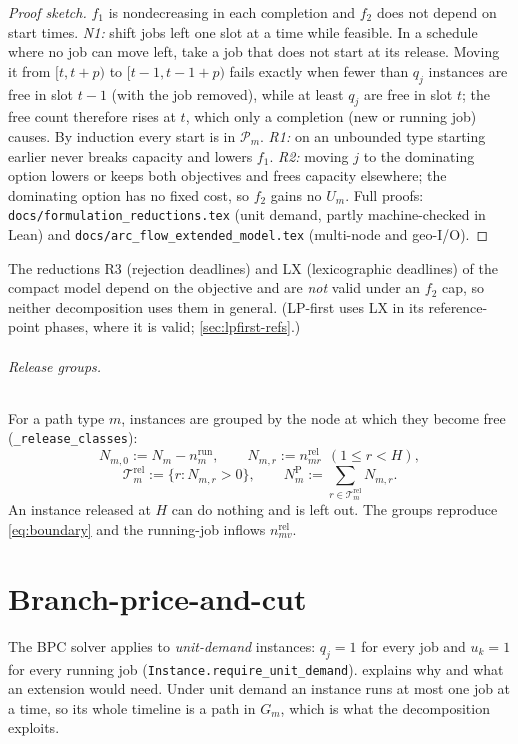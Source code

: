 \documentclass[11pt,a4paper]{article}
\theoremstyle{definition}
\theoremstyle{remark}
\newcommand{\Rel}{\mathcal{T}^{\mathrm{rel}}}
\newcommand{\code}[1]{\texttt{#1}}
\newcommand{\nrun}{n^{\mathrm{run}}}
\newcommand{\nrel}{n^{\mathrm{rel}}}
\begin{document}
\begin{proof}[Proof sketch]
$f_1$ is nondecreasing in each completion and $f_2$ does not depend on start
times. \emph{N1:} shift jobs left one slot at a time while feasible. In a
schedule where no job can move left, take a job that does not start at its
release. Moving it from $[t,t+p)$ to $[t-1,t-1+p)$ fails exactly when fewer
than $q_j$ instances are free in slot $t-1$ (with the job removed), while at
least $q_j$ are free in slot $t$; the free count therefore rises at $t$, which
only a completion (new or running job) causes. By induction every start is in
$\mathcal P_m$. \emph{R1:} on an unbounded type starting earlier never breaks
capacity and lowers $f_1$. \emph{R2:} moving $j$ to the dominating option lowers
or keeps both objectives and frees capacity elsewhere; the dominating option
has no fixed cost, so $f_2$ gains no $U_m$. Full proofs:
\code{docs/formulation\_reductions.tex} (unit demand, partly machine-checked in
Lean) and \code{docs/arc\_flow\_extended\_model.tex} (multi-node and geo-I/O).
\end{proof}

The reductions R3 (rejection deadlines) and LX (lexicographic deadlines) of
the compact model depend on the objective and are \emph{not} valid under an
$f_2$ cap, so neither decomposition uses them in general. (LP-first uses LX in
its reference-point phases, where it is valid; \cref{sec:lpfirst-refs}.)

\paragraph{Release groups.} For a path type $m$, instances are grouped by the
node at which they become free (\code{\_release\_classes}):
\[
N_{m,0}:=N_m-\nrun_m,\qquad N_{m,r}:=\nrel_{mr}\ \ (1\le r<H),
\]
\[
\Rel_m:=\{r:N_{m,r}>0\},\qquad N^{\mathrm P}_m:=\sum_{r\in\Rel_m}N_{m,r}.
\]
An instance released at $H$ can do nothing and is left out. The groups
reproduce \eqref{eq:boundary} and the running-job inflows $\nrel_{mv}$.

\part*{Branch-price-and-cut}

The BPC solver applies to \emph{unit-demand} instances: $q_j=1$ for every job
and $u_k=1$ for every running job (\code{Instance.require\_unit\_demand}).
 explains why and what an extension would need. Under unit
demand an instance runs at most one job at a time, so its whole timeline is a
path in $G_m$, which is what the decomposition exploits.
\end{document}
